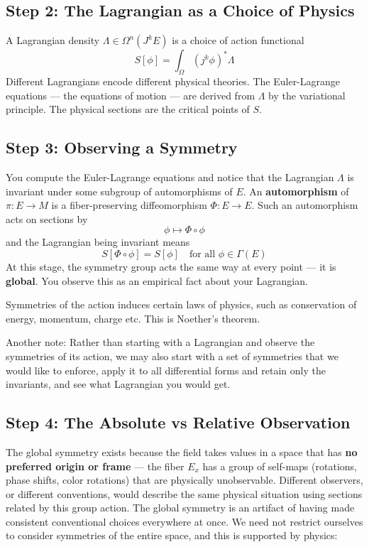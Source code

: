 \documentclass[a4paper]{article}
\begin{document}
\subsection*{Step 2: The Lagrangian as a Choice of Physics}

A Lagrangian density $\Lambda \in \Omega^n(J^kE)$ is a choice of action functional
\[
S[\phi] = \int_\Omega (j^k\phi)^*\Lambda
\]
Different Lagrangians encode different physical theories. The Euler-Lagrange equations — the equations of motion — are derived from $\Lambda$ by the variational principle. The physical sections are the critical points of $S$.

\subsection*{Step 3: Observing a Symmetry}

You compute the Euler-Lagrange equations and notice that the Lagrangian $\Lambda$ is invariant under some subgroup of automorphisms of $E$. An \textbf{automorphism} of $\pi: E \to M$ is a fiber-preserving diffeomorphism $\Phi: E \to E$. Such an automorphism acts on sections by
\[
\phi \mapsto \Phi \circ \phi
\]
and the Lagrangian being invariant means
\[
S[\Phi \circ \phi] = S[\phi] \quad \text{for all } \phi \in \Gamma(E)
\]
At this stage, the symmetry group acts the same way at every point — it is \textbf{global}. You observe this as an empirical fact about your Lagrangian. 

Symmetries of the action induces certain laws of physics, such as conservation of energy, momentum, charge etc. This is Noether's theorem. 

Another note: Rather than starting with a Lagrangian and observe the symmetries of its action, we may also start with a set of symmetries that we would like to enforce, apply it to all differential forms and retain only the invariants, and see what Lagrangian you would get. 

\subsection*{Step 4: The Absolute vs Relative Observation}
The global symmetry exists because the field takes values in a space that has \textbf{no preferred origin or frame} — the fiber $E_x$ has a group of self-maps (rotations, phase shifts, color rotations) that are physically unobservable. Different observers, or different conventions, would describe the same physical situation using sections related by this group action. The global symmetry is an artifact of having made consistent conventional choices everywhere at once. We need not restrict ourselves to consider symmetries of the entire space, and this is supported by physics: 
\end{document}
